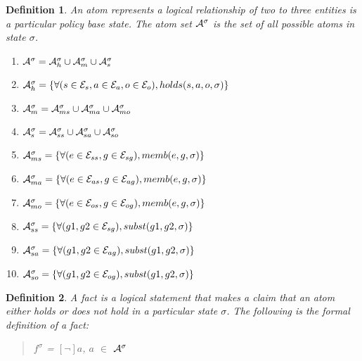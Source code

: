 \documentclass[10pt, twocolumn]{article}
\newtheorem{definition}{Definition}
\begin{document}
        \begin{definition}
          An atom represents a logical relationship of two to three entities
          is a particular policy base state. The atom set $\cal{A}^{\sigma}$ is
          the set of all possible atoms in state $\sigma$.

          \begin{enumerate}
            \item
              ${\cal A}^{\sigma} = {\cal A}^{\sigma}_{h} \cup {\cal A}^{\sigma}_{m} \cup {\cal A}^{\sigma}_{s}$
            \item
              ${\cal A}^{\sigma}_{h} = \{\forall (s \in {\cal E}_{s}, a \in {\cal E}_{a}, o \in {\cal E}_{o}), holds(s, a, o, \sigma) \}$
            \item
              ${\cal A}^{\sigma}_{m} = {\cal A}^{\sigma}_{ms} \cup {\cal A}^{\sigma}_{ma} \cup {\cal A}^{\sigma}_{mo}$
            \item
              ${\cal A}^{\sigma}_{s} = {\cal A}^{\sigma}_{ss} \cup {\cal A}^{\sigma}_{sa} \cup {\cal A}^{\sigma}_{so}$
            \item
              ${\cal A}^{\sigma}_{ms} = \{\forall (e \in {\cal E}_{ss}, g \in {\cal E}_{sg}), memb(e, g, \sigma)\}$
            \item
              ${\cal A}^{\sigma}_{ma} = \{\forall (e \in {\cal E}_{as}, g \in {\cal E}_{ag}), memb(e, g, \sigma)\}$
            \item
              ${\cal A}^{\sigma}_{mo} = \{\forall (e \in {\cal E}_{os}, g \in {\cal E}_{og}), memb(e, g, \sigma)\}$
            \item
              ${\cal A}^{\sigma}_{ss} = \{\forall (g1, g2 \in {\cal E}_{sg}), subst(g1, g2, \sigma)\}$
            \item
              ${\cal A}^{\sigma}_{sa} = \{\forall (g1, g2 \in {\cal E}_{ag}), subst(g1, g2, \sigma)\}$
            \item
              ${\cal A}^{\sigma}_{so} = \{\forall (g1, g2 \in {\cal E}_{og}), subst(g1, g2, \sigma)\}$
          \end{enumerate}

        \end{definition} 

        \begin{definition}
          A fact is a logical statement that makes a claim that an atom either
          holds or does not hold in a particular state $\sigma$. The following
          is the formal definition of a fact:

          \begin{quote}
            $f^{\sigma}$ = $[\lnot]$$a$, $a$ $\in$ ${\cal A}^{\sigma}$
          \end{quote}
        \end{definition}
\end{document}
